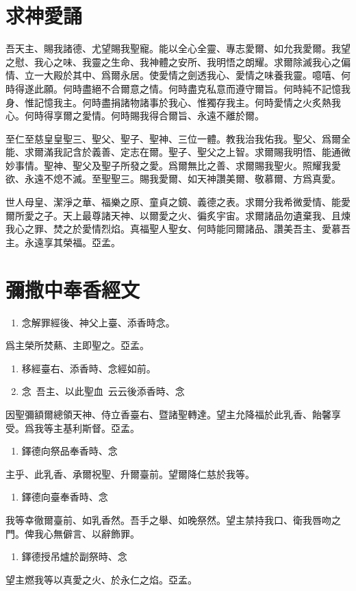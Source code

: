 \section*{求神愛誦}
吾天主、賜我諸德、尤望賜我聖寵。能以全心全靈、專志愛爾、如允我愛爾。我望之慰、我心之味、我靈之生命、我神體之安所、我明悟之朗耀。求爾除滅我心之偏情、立一大殿於其中、爲爾永居。使愛情之劍透我心、愛情之味養我靈。噫嘻、何時得遂此願。何時盡絕不合爾意之情。何時盡克私意而遵守爾旨。何時純不記憶我身、惟記憶我主。何時盡捐諸物諸事於我心、惟獨存我主。何時愛情之火炙熱我心。何時得享爾之愛情。何時賜我得合爾旨、永遠不離於爾。

至仁至慈皇皇聖三、聖父、聖子、聖神、三位一體。教我治我佑我。聖父、爲爾全能、求爾滿我記含於義善、定志在爾。聖子、聖父之上智。求爾賜我明悟、能通微妙事情。聖神、聖父及聖子所發之愛。爲爾無比之善、求爾賜我聖火。照耀我愛欲、永遠不熄不滅。至聖聖三。賜我愛爾、如天神讚美爾、敬慕爾、方爲真愛。

世人母皇、潔淨之華、福樂之原、童貞之鏡、義德之表。求爾分我希微愛情、能愛爾所愛之子。天上最尊諸天神、以爾愛之火、徧炙宇宙。求爾諸品勿遺棄我、且煉我心之罪、焚之於愛情烈焰。真福聖人聖女、何時能同爾諸品、讚美吾主、愛慕吾主。永遠享其榮福。{\cspace}亞孟。
\section*{彌撒中奉香經文}
\begin{enumerate}
    \item[]{\small 念解罪經後、神父上臺、添香時念。}
\end{enumerate}
爲主榮所焚爇、主即聖之。{\cspace}亞孟。
\begin{enumerate}
    \item[]{\small 移經臺右、添香時、念經如前。}
    \item[]{\small 念}\ 吾主、以此聖血\ {\small 云云後添香時、念}
\end{enumerate}
因聖彌額爾總領天神、侍立香臺右、暨諸聖轉達。望主允降福於此乳香、飴馨享受。爲我等主基利斯督。{\cspace}亞孟。
\begin{enumerate}
    \item[]{\small 鐸德向祭品奉香時、念}
\end{enumerate}
主乎、此乳香、承爾祝聖、升爾臺前。望爾降仁慈於我等。
\begin{enumerate}
    \item[]{\small 鐸德向臺奉香時、念}
\end{enumerate}
我等幸徹爾臺前、如乳香然。吾手之舉、如晚祭然。望主禁持我口、衛我唇吻之門。俾我心無僻言、以辭飾罪。
\begin{enumerate}
    \item[]{\small 鐸德授吊爐於副祭時、念}
\end{enumerate}
望主燃我等以真愛之火、於永仁之焰。{\cspace}亞孟。

